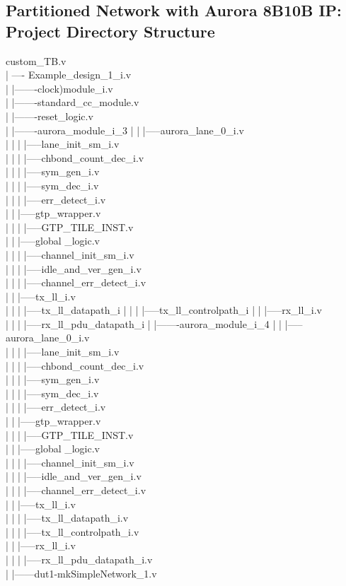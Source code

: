 \begin{appendix}
\section {Partitioned Network with Aurora 8B10B IP: Project Directory Structure}
\label{CONNECTAurora}
custom\_TB.v \\
	| ---- Example\_design\_1\_i.v \\
	|       		|-------clock)module\_i.v \\
	|		|-------standard\_cc\_module.v \\
	|		|-------reset\_logic.v \\
	|		|-------aurora\_module\_i\_3
	|		|		|-----aurora\_lane\_0\_i.v \\
	|		|		|		|-----lane\_init\_sm\_i.v \\
	|		|		|		|-----chbond\_count\_dec\_i.v \\
	|		|		|		|-----sym\_gen\_i.v \\
	|		|		|		|-----sym\_dec\_i.v \\
	|		|		|		|-----err\_detect\_i.v \\
	|		|		|-----gtp\_wrapper.v \\
	|		|		|		|-----GTP\_TILE\_INST.v \\
	|		|		|-----global \_logic.v \\
	|		|		|		|-----channel\_init\_sm\_i.v \\
	|		|		|		|-----idle\_and\_ver\_gen\_i.v \\
	|		|		|		|-----channel\_err\_detect\_i.v \\
	|		|		|-----tx\_ll\_i.v \\
	|		|		|		|-----tx\_ll\_datapath\_i
	|		|		|		|-----tx\_ll\_controlpath\_i
	|		|		|-----rx\_ll\_i.v \\
	|		|		|		|-----rx\_ll\_pdu\_datapath\_i
	|		|-------aurora\_module\_i\_4
	|		|		|-----aurora\_lane\_0\_i.v \\
	|		|		|		|-----lane\_init\_sm\_i.v \\
	|		|		|		|-----chbond\_count\_dec\_i.v \\
	|		|		|		|-----sym\_gen\_i.v \\
	|		|		|		|-----sym\_dec\_i.v \\
	|		|		|		|-----err\_detect\_i.v \\
	|		|		|-----gtp\_wrapper.v \\
	|		|		|		|-----GTP\_TILE\_INST.v \\
	|		|		|-----global \_logic.v \\
	|		|		|		|-----channel\_init\_sm\_i.v \\
	|		|		|		|-----idle\_and\_ver\_gen\_i.v \\
	|		|		|		|-----channel\_err\_detect\_i.v \\
	|		|		|-----tx\_ll\_i.v \\
	|		|		|		|-----tx\_ll\_datapath\_i.v \\
	|		|		|		|-----tx\_ll\_controlpath\_i.v \\
	|		|		|-----rx\_ll\_i.v \\
	|		|		|		|-----rx\_ll\_pdu\_datapath\_i.v \\
	|		|------dut1-mkSimpleNetwork\_1.v \\


\end{appendix}
